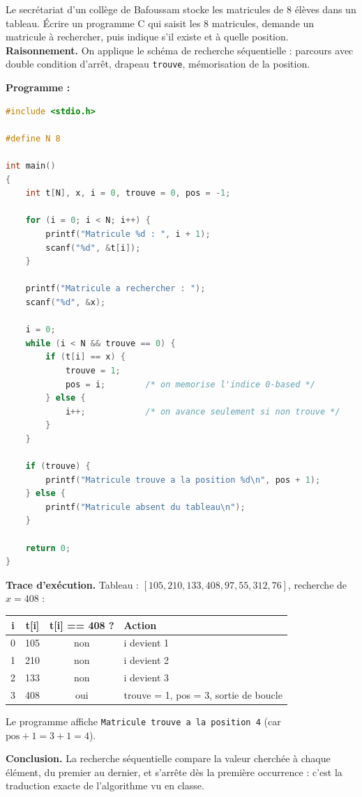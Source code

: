 \documentclass[11pt]{article}
\begin{document}
\begin{exoresolu}
Le secrétariat d'un collège de Bafoussam stocke les matricules de 8 élèves dans un tableau. Écrire un programme C qui saisit les 8 matricules, demande un matricule à rechercher, puis indique s'il existe et à quelle position.
\tcblower
\textbf{Raisonnement.} On applique le schéma de recherche séquentielle : parcours avec double condition d'arrêt, drapeau \texttt{trouve}, mémorisation de la position.

\textbf{Programme :}
\begin{lstlisting}[language=C]
#include <stdio.h>

#define N 8

int main()
{
    int t[N], x, i = 0, trouve = 0, pos = -1;

    for (i = 0; i < N; i++) {
        printf("Matricule %d : ", i + 1);
        scanf("%d", &t[i]);
    }

    printf("Matricule a rechercher : ");
    scanf("%d", &x);

    i = 0;
    while (i < N && trouve == 0) {
        if (t[i] == x) {
            trouve = 1;
            pos = i;        /* on memorise l'indice 0-based */
        } else {
            i++;            /* on avance seulement si non trouve */
        }
    }

    if (trouve) {
        printf("Matricule trouve a la position %d\n", pos + 1);
    } else {
        printf("Matricule absent du tableau\n");
    }

    return 0;
}
\end{lstlisting}
\textbf{Trace d'exécution.} Tableau : $[105, 210, 133, 408, 97, 55, 312, 76]$, recherche de $x = 408$ :
\begin{center}
\begin{tabularx}{\linewidth}{|c|c|c|X|}
\hline
\rowcolor{popblueL} \textbf{i} & \textbf{t[i]} & \textbf{t[i] == 408 ?} & \textbf{Action} \\
\hline
0 & 105 & non & i devient 1 \\
\hline
1 & 210 & non & i devient 2 \\
\hline
2 & 133 & non & i devient 3 \\
\hline
3 & 408 & oui & trouve = 1, pos = 3, sortie de boucle \\
\hline
\end{tabularx}
\end{center}
Le programme affiche \texttt{Matricule trouve a la position 4} (car $\text{pos} + 1 = 3 + 1 = 4$).

\textbf{Conclusion.} La recherche séquentielle compare la valeur cherchée à chaque élément, du premier au dernier, et s'arrête dès la première occurrence : c'est la traduction exacte de l'algorithme vu en classe.
\end{exoresolu}
\end{document}
